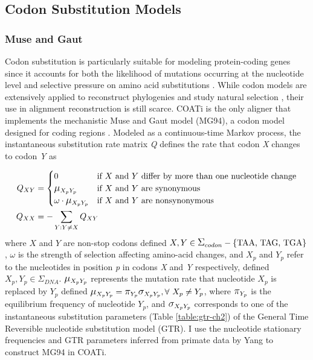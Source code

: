 \clearpage

\subsection{Codon Substitution Models} %

\subsubsection{Muse and Gaut}

Codon substitution is particularly suitable for modeling protein-coding genes since it accounts for both the likelihood of mutations occurring at the nucleotide level and selective pressure on amino acid substitutions \citep{sullivan2005model}. While codon models are extensively applied to reconstruct phylogenies and study natural selection \citep{delport2009models}, their use in alignment reconstruction is still scarce. COATi is the only aligner that implements the mechanistic Muse and Gaut model (MG94), a codon model designed for coding regions \citep{muse_gaut_1994}. Modeled as a continuous-time Markov process, the instantaneous substitution rate matrix \textit{Q} defines the rate that codon \textit{X} changes to codon \textit{Y} as

\begin{align}
Q_{XY} &=  \begin{cases}
    0 & \text{if $X$ and $Y$ differ by more than one nucleotide change}\\
    \grande{\mu}_{X_pY_p} & \text{if $X$ and $Y$ are synonymous}\\
    \omega \cdot \grande{\mu}_{X_pY_p} & \text{if $X$ and $Y$ are nonsynonymous}
\end{cases}\\
Q_{XX} &= -\sum_{Y:Y \neq X} Q_{XY}
\end{align}
where $X$ and $Y$ are non-stop codons defined $X,Y \in \grande{\Sigma}_{codon} - \{\text{TAA, TAG, TGA}\}$, $\omega$ is the strength of selection affecting amino-acid changes, and $X_p$ and $Y_p$ refer to the nucleotides in position \textit{p} in codons \textit{X} and \textit{Y} respectively, defined $X_p, Y_p \in \Sigma_{DNA}$. $\grande{\mu}_{X_pY_p}$ represents the mutation rate that nucleotide $X_p$ is replaced by $Y_p$ defined $\grande{\mu}_{X_pY_p} = \grande{\pi}_{Y_p} \grande{\sigma}_{X_pY_p}, \forall\ X_p \neq Y_p$, where $\grande{\pi}_{Y_p}$ is the equilibrium frequency of nucleotide $Y_p$, and $ \grande{\sigma}_{X_pY_p}$ corresponds to one of the instantaneous substitution parameters (Table \ref{table:gtr-ch2}) of the General Time Reversible nucleotide substitution model \citep{tavare_gtr_1986} (GTR). I use the nucleotide stationary frequencies and GTR parameters inferred from primate data by Yang \citeyear{yang1994estimating} to construct MG94 in COATi.

